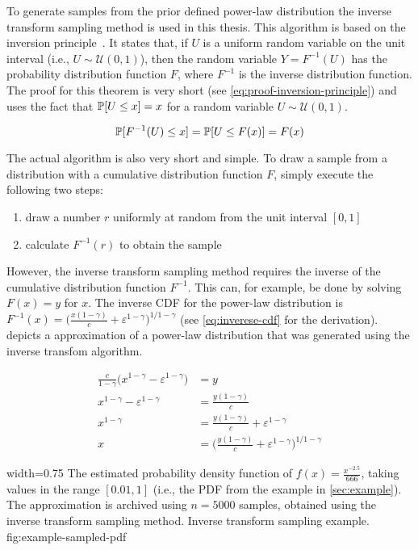 To generate samples from the prior defined power-law distribution the inverse transform sampling method is used in this thesis.
This algorithm is based on the inversion principle~\cite{Devroye1986}.
It states that, if \(U\) is a uniform random variable on the unit interval (i.e., \(U \sim \mathcal{U}(0,1)\)), then the random variable \(Y = F^{-1}(U)\) has the probability distribution function \(F\), where \(F^{-1}\) is the inverse distribution function.
The proof for this theorem is very short (see \cref{eq:proof-inversion-principle}) and uses the fact that \(\mathbb{P}[{U \leq x}] = x\) for a random variable \(U \sim \mathcal{U}(0,1)\).

\begin{equation}
    \mathbb{P}[{F^{-1}(U) \leq x}] = \mathbb{P}[{U \leq F(x)}] = F(x)
    \label{eq:proof-inversion-principle}
\end{equation}

The actual algorithm is also very short and simple.
To draw a sample from a distribution with a cumulative distribution function \(F\), simply execute the following two steps:

\begin{enumerate}
    \item draw a number \(r\) uniformly at random from the unit interval \([0, 1]\)
    \item calculate \(F^{-1}(r)\) to obtain the sample
\end{enumerate}

However, the inverse transform sampling method requires the inverse of the cumulative distribution function \(F^{-1}\).
This can, for example, be done by solving \(F(x) = y\) for \(x\).
The inverse CDF for the power-law distribution is \(F^{-1}(x) = \Big( \frac{x(1-\gamma)}{c} + \varepsilon^{1-\gamma} \Big)^{1/1-\gamma}\) (see \cref{eq:inverese-cdf} for the derivation).
 depicts a approximation of a power-law distribution that was generated using the inverse transfom algorithm.

\begin{align}
	\frac{c}{1-\gamma} \Big( x^{1 - \gamma} - \varepsilon^{1 - \gamma} \Big) & = y \\
    x^{1-\gamma} - \varepsilon^{1-\gamma} & = \frac{y(1-\gamma)}{c} \\
    x^{1-\gamma} & = \frac{y(1-\gamma)}{c} + \varepsilon^{1-\gamma} \\
    x & = \Big( \frac{y(1-\gamma)}{c} + \varepsilon^{1-\gamma} \Big)^{1/1-\gamma}
\label{eq:inverese-cdf}
\end{align}

      {width=0.75\textwidth}
      {The estimated probability density function of \(f(x) = \frac{x^{-2.5}}{666}\), taking values in the range \([0.01, 1]\) (i.e., the PDF from the example in \cref{sec:example}). The approximation is archived using \(n = 5000\) samples, obtained using the inverse transform sampling method.}
      {Inverse transform sampling example.}
      {fig:example-sampled-pdf}
